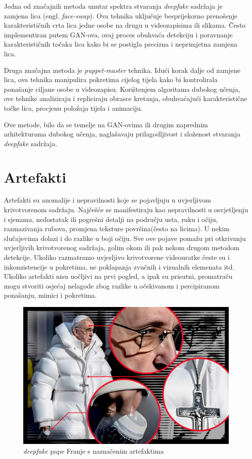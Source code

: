 \documentclass[seminarski, times, utf8]{fer}
\begin{document}
Jedna od značajnih metoda unutar spektra stvaranja \textit{deepfake} sadržaja je zamjena lica (engl. \textit{face-swap}). Ova tehnika uključuje besprijekorno prenošenje karakterističnih crta lica jedne osobe na drugu u videozapisima ili slikama. Često implementiran putem GAN-ova, ovaj proces obuhvaća detekciju i poravnanje karakterističnih točaka lica kako bi se postigla precizna i neprimjetna zamjena lica.

Druga značajna metoda je \textit{puppet-master} tehnika. Idući korak dalje od zamjene lica, ova tehnika manipulira pokretima cijelog tijela kako bi kontrolirala ponašanje ciljane osobe u videozapisu. Korištenjem algoritama dubokog učenja, ove tehnike analiziraju i repliciraju obrasce kretanja, obuhvaćajući karakteristične točke lica, procjenu položaja tijela i animaciju.

Ove metode, bilo da se temelje na GAN-ovima ili drugim naprednim arhitekturama dubokog učenja, naglašavaju prilagodljivost i složenost stvaranja \textit{deepfake} sadržaja. 

\section{Artefakti}
Artefakti su anomalije i nepravilnosti koje se pojavljuju u uvjerljivom krivotvorenom sadržaju. Najčešće se manifestiraju kao nepravilnosti u osvjetljenju i sjenama, nedostatak ili pogrešni detalji na području usta, ruku i očiju, razmazivanja rubova, promjena teksture površina(često na licima).
U nekim slučajevima dolazi i do razlike u boji očiju. Sve ove pojave pomažu pri otkrivanju uvjerljivih krivotvorenog sadržaja, golim okom ili pak nekom drugom metodom detekcije. Ukoliko razmatramo uvjerljivo krivotvorene videouratke česte su i inkonzistencije u pokretima, ne poklapanja zvučnih i vizualnih elemenata itd.
Ukoliko artefakti nisu uočljivi na prvi pogled, a ipak su prisutni, promatraču mogu stvoriti osjećaj nelagode zbog razlike u očekivanom i percipiranom ponašanju, mimici i pokretima.
\begin{figure}[H]
   \centering
   \includegraphics[width=0.7\linewidth]{slike/papa.png}
   \caption{\textit{deepfake} pape Franje s naznačenim artefaktima}
   \label{fig:report}
\end{figure}
\end{document}
